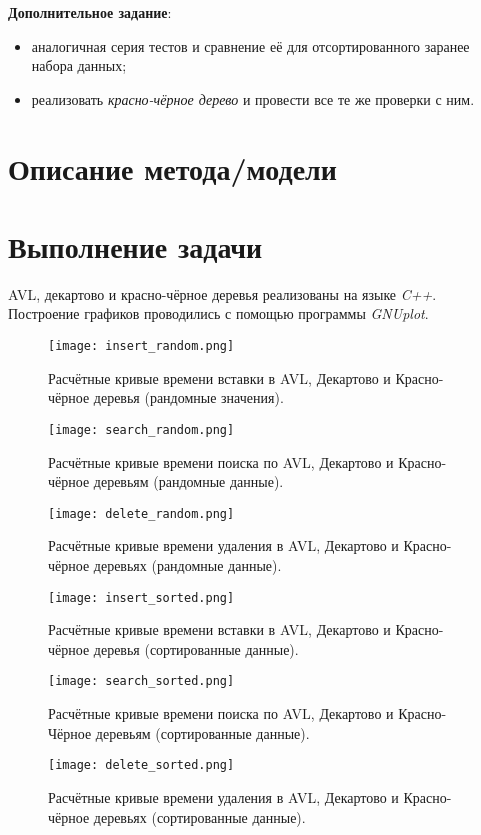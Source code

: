 \documentclass[12pt, a4paper]{report}
\begin{document}
	\par
	\textbf{Дополнительное задание}:
	\begin{itemize}
		\item аналогичная серия тестов и сравнение её для отсортированного заранее набора данных;
		\item реализовать \textit{красно-чёрное дерево} и провести все те же проверки с ним.
	\end{itemize}
	
	\newpage

	\section*{Описание метода/модели}
	\large

	\newpage

	\section*{Выполнение задачи}
	AVL, декартово и красно-чёрное деревья реализованы на языке \textit{C++}. Построение графиков проводились с помощью программы \textit{GNUplot}.

	\newpage
	\vfill

	\begin{figure}[h]
		\centering
		\texttt{[image: insert\_random.png]}
		\caption{Расчётные кривые времени вставки в AVL, Декартово и Красно-чёрное деревья (рандомные значения).}
	\end{figure}
	\begin{figure}[h]
		\centering
		\texttt{[image: search\_random.png]}
		\caption{Расчётные кривые времени поиска по AVL, Декартово и Красно-чёрное деревьям (рандомные данные).}
	\end{figure}
	\begin{figure}[h]
		\centering
		\texttt{[image: delete\_random.png]}
		\caption{Расчётные кривые времени удаления в AVL, Декартово и Красно-чёрное деревьях (рандомные данные).}
	\end{figure}
	\begin{figure}[h]
		\centering
		\texttt{[image: insert\_sorted.png]}
		\caption{Расчётные кривые времени вставки в AVL, Декартово и Красно-чёрное деревья (сортированные данные).}
	\end{figure}
	\begin{figure}[h]
		\centering
		\texttt{[image: search\_sorted.png]}
		\caption{Расчётные кривые времени поиска по AVL, Декартово и Красно-Чёрное деревьям (сортированные данные).}
	\end{figure}
	\begin{figure}[h]
		\centering
		\texttt{[image: delete\_sorted.png]}
		\caption{Расчётные кривые времени удаления в AVL, Декартово и Красно-чёрное деревьях (сортированные данные).}
	\end{figure}	
\end{document}
